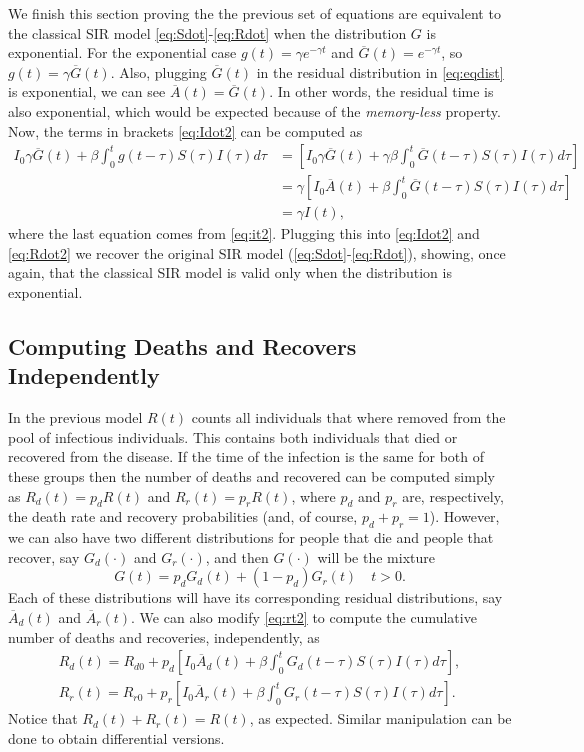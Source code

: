 \documentclass[USenglish,10pt]{article}
\newcommand{\Ab}{\overline{A}\xspace}
\newcommand{\Gb}{\overline{G}\xspace}
\begin{document}
We finish this section proving the the previous set of equations are equivalent to the classical SIR model \eqref{eq:Sdot}-\eqref{eq:Rdot} when the distribution $G$ is exponential.
For the exponential case  $g(t)=\gamma e^{-\gamma t}$ and $\Gb(t)=e^{-\gamma t}$, so $g(t)=\gamma\Gb(t)$. Also, plugging $\Gb(t)$ in the residual distribution in \eqref{eq:eqdist} is exponential, we can see $\Ab(t) = \Gb(t)$. In other words, the residual time is also exponential, which would be expected because of the \textit{memory-less} property.
Now, the terms in brackets \eqref{eq:Idot2} can be computed as
\begin{align*}
I_0 \gamma \Gb(t) + \beta\int_0^t g(t-\tau) S(\tau)I(\tau)d\tau
&= \left[ I_0  \gamma\Gb(t) + \gamma\beta\int_0^t \Gb(t-\tau) S(\tau)I(\tau)d\tau \right]\\
&= \gamma\left[ I_0  \Ab(t) + \beta\int_0^t \Gb(t-\tau) S(\tau)I(\tau)d\tau \right]\\
&= \gamma I(t),
\end{align*}
where the last equation comes from \eqref{eq:it2}.
Plugging this into \eqref{eq:Idot2} and \eqref{eq:Rdot2} we recover the original SIR model (\eqref{eq:Sdot}-\eqref{eq:Rdot}), showing, once again, that the classical SIR model is valid only when the distribution is exponential.

\subsection{Computing Deaths and Recovers Independently}

In the previous model $R(t)$ counts all individuals that where removed from the pool of infectious individuals. This contains both individuals that died or recovered from the disease. If the time of the infection is the same for both of these groups then the number of deaths and recovered can be computed simply as $R_d(t)=p_dR(t)$ and $R_r(t)=p_rR(t)$, where $p_d$ and $p_r$ are, respectively, the death rate and recovery probabilities (and, of course, $p_d+p_r=1$).
However, we can also have  two different distributions for people that die and people that recover, say $G_d(\cdot)$ and $G_r(\cdot)$, and then $G(\cdot)$ will be the mixture
\[ G(t) = p_dG_d(t) + (1-p_d)G_r(t) \quad t>0.\]
Each of these distributions will have its corresponding residual distributions, say $\Ab_d(t)$ and $\Ab_r(t)$.
We can also modify \eqref{eq:rt2} to compute the cumulative number of deaths and recoveries, independently, as
\begin{equation*}
	\begin{gathered}
		R_d(t) = R_{d0} + p_d\left[I_0\Ab_d(t) + \beta \int_0^t G_d(t-\tau) S(\tau)I(\tau)d\tau\right], \\
		R_r(t) = R_{r0} + p_r\left[I_0\Ab_r(t) + \beta \int_0^t G_r(t-\tau) S(\tau)I(\tau)d\tau\right].
	\end{gathered}
\end{equation*}
Notice that $R_d(t) + R_r(t) = R(t)$, as expected. Similar manipulation can be done to obtain differential versions.
\end{document}
